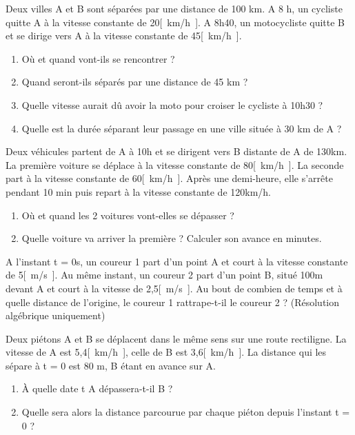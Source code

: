 \begin{exercise}
    Deux villes A et B sont séparées par une distance de 100 km. A 8 h, un cycliste quitte A à la vitesse constante de 20\unit{[km/h]}. A 8h40, un motocycliste quitte B et se dirige vers A à la vitesse constante de 45\unit{[km/h]}.
    \begin{enumerate}[label=\alph*)]
        \item Où et quand vont-ils se rencontrer ?
        \item Quand seront-ils séparés par une distance de 45 km ?
        \item Quelle vitesse aurait dû avoir la moto pour croiser le cycliste à 10h30 ?
        \item Quelle est la durée séparant leur passage en une ville située à 30 km de A ?
    \end{enumerate}
\end{exercise}

\begin{exercise}
    Deux véhicules partent de A à 10h et se dirigent vers B distante de A de 130km. La première voiture se déplace à la vitesse constante de 80\unit{[km/h]}. La seconde part à la vitesse constante de 60\unit{[km/h]}. Après une demi-heure, elle s'arrête pendant 10 min puis repart à la vitesse constante de 120km/h.
    \begin{enumerate}[label=\alph*)]
        \item Où et quand les 2 voitures vont-elles se dépasser ?
        \item Quelle voiture va arriver la première ? Calculer son avance en minutes.
    \end{enumerate}
\end{exercise}

\begin{exercise}
    A l'instant t = 0s, un coureur 1 part d'un point A et court à la vitesse constante de 5\unit{[m/s]}. Au même instant, un coureur 2 part d'un point B, situé 100m devant A et court à la vitesse de 2,5\unit{[m/s]}.
    Au bout de combien de temps et à quelle distance de l'origine, le coureur 1 rattrape-t-il le coureur 2 ? (Résolution algébrique uniquement)
\end{exercise}

\begin{exercise}
    Deux piétons A et B se déplacent dans le même sens sur une route rectiligne. La vitesse de A est 5,4\unit{[km/h]}, celle de B est 3,6\unit{[km/h]}. La distance qui les sépare à t = 0 est 80 m, B étant en avance sur A.
    \begin{enumerate}[label=\alph*)]
        \item À quelle date t A dépassera-t-il B ?
        \item Quelle sera alors la distance parcourue par chaque piéton depuis l'instant t = 0 ?
    \end{enumerate}
\end{exercise}

